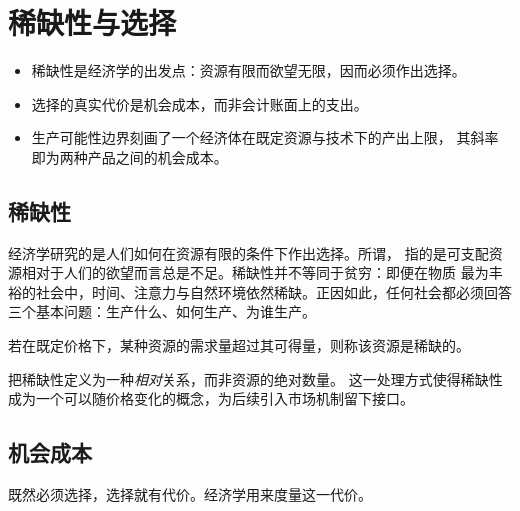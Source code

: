\chapter{稀缺性与选择}
\label{ch:scarcity}

\begin{keypoint}
  \begin{itemize}
    \item 稀缺性是经济学的出发点：资源有限而欲望无限，因而必须作出选择。
    \item 选择的真实代价是机会成本，而非会计账面上的支出。
    \item 生产可能性边界刻画了一个经济体在既定资源与技术下的产出上限，
          其斜率即为两种产品之间的机会成本。
  \end{itemize}
\end{keypoint}

\section{稀缺性}
\label{sec:scarcity}

经济学研究的是人们如何在资源有限的条件下作出选择。所谓，
指的是可支配资源相对于人们的欲望而言总是不足。稀缺性并不等同于贫穷：即便在物质
最为丰裕的社会中，时间、注意力与自然环境依然稀缺。正因如此，任何社会都必须回答
三个基本问题：生产什么、如何生产、为谁生产。

\begin{definition}[稀缺性]
  \label{def:scarcity}
  若在既定价格下，某种资源的需求量超过其可得量，则称该资源是稀缺的。
\end{definition}

\begin{remark}
   把稀缺性定义为一种\emph{相对}关系，而非资源的绝对数量。
  这一处理方式使得稀缺性成为一个可以随价格变化的概念，为后续引入市场机制留下接口。
\end{remark}

\section{机会成本}
\label{sec:opportunity-cost}

既然必须选择，选择就有代价。经济学用来度量这一代价。

